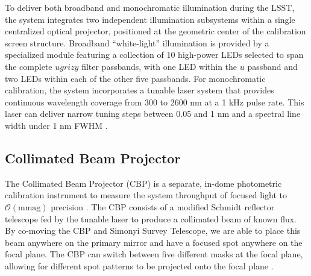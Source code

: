 To deliver both broadband and monochromatic illumination during the LSST, the system integrates two
independent illumination subsystems within a single centralized optical projector, positioned at the
geometric center of the calibration screen structure. Broadband ``white-light'' illumination is provided
by a specialized module featuring a collection of 10 high-power LEDs selected to span the complete
$ugrizy$ filter passbands, with one LED within the $u$ passband and two LEDs within each of the
other five passbands. For monochromatic calibration, the system incorporates a tunable laser
system that provides continuous wavelength coverage from 300 to 2600 nm at a 1 kHz pulse rate. This
laser can deliver narrow tuning steps between 0.05 and 1 nm and a spectral line width under 1 nm FWHM \citep{TSTN-065}.


\subsection{Collimated Beam Projector}\label{sec:calsys:cbp}

The Collimated Beam Projector (CBP) is a separate, in-dome photometric calibration instrument to
measure the system throughput of focused light to $\mathcal{O}(\text{mmag})$ precision \citep{2026arXiv260631822A}.
The CBP consists of a modified Schmidt reflector telescope fed by the tunable laser to produce a
collimated beam of known flux. By co-moving the CBP and Simonyi Survey Telescope, we are able to
place this beam anywhere on the primary mirror and have a focused spot anywhere on the focal plane.
The CBP can switch between five different masks at the focal plane, allowing for different spot
patterns to be projected onto the focal plane \citep{2026arXiv260631822A}.